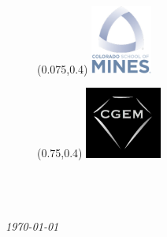 \documentclass{beamer}
\newcommand{\titlefont}{\fontsize{30}{30}\selectfont \color{white}}
\newcommand{\authorfont}{\fontsize{12}{24}\selectfont \color{cgemblue}}
\newcommand{\datefont}{\fontsize{10}{12}\selectfont \color{white} \textit}
\begin{document}
  \begin{frame}
    \begin{figure}
      \begin{textblock*}{2cm}(0.075\paperwidth,0.4\paperheight)
        \includegraphics[width=2cm]{mines-2018}
      \end{textblock*}
    \end{figure}
    \begin{figure}
      \begin{textblock*}{2.5cm}(0.75\paperwidth,0.4\paperheight)
        \includegraphics[width=2.5cm]{cgem-logo}
      \end{textblock*}
    \end{figure}
    \begin{center}
      \titlefont{Overly Flowery Presentation Title} \\[1cm]
      \authorfont{R. Nate Crummett} \\
      \authorfont{Yaoguo Li} \\[1cm]
      \datefont{\today}
    \end{center}
  \end{frame}
\end{document}
